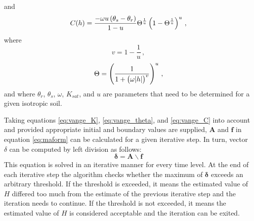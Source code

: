 and
\begin{equation}
  \label{eq:vange_C}
  C(h) = \frac{-\omega u \del{ \theta_s - \theta_r }}{1 - u} \Theta^{\frac{1}{u}} \del{ 1 - \Theta^{\frac{1}{u}} }^u \, ,
\end{equation}
where
\begin{equation*}
  v = 1 - \frac{1}{u} \, ,
\end{equation*}
\begin{equation*}
  \Theta = \del{ \frac{1}{1 + \del{ \omega \abs{h} }^v} }^u \, ,
\end{equation*}
and where $\theta_r$, $\theta_s$, $\omega$, $K_{sat}$, and $u$ are parameters that need to be determined for a given isotropic soil.

Taking equations \eqref{eq:vange_K}, \eqref{eq:vange_theta}, and \eqref{eq:vange_C} into account and provided appropriate initial and boundary values are supplied, $\mathbf{A}$ and $\mathbf{f}$ in equation \eqref{eq:maform} can be calculated for a given iterative step.  In turn, vector $\delta$ can be computed by left division as follows:
\begin{equation}
  \label{eq:maform_ledi}
  \boldsymbol{\delta} = \mathbf{A \backslash f}
\end{equation}
This equation is solved in an iterative manner for every time level.  At the end of each iterative step the algorithm checks whether the maximum of $\boldsymbol{\delta}$ exceeds an arbitrary threshold.
If the threshold is exceeded, it means the estimated value of $H$ differed too much from the estimate of the previous iterative step and the iteration needs to continue.
If the threshold is not exceeded, it means the estimated value of $H$ is considered acceptable and the iteration can be exited.

